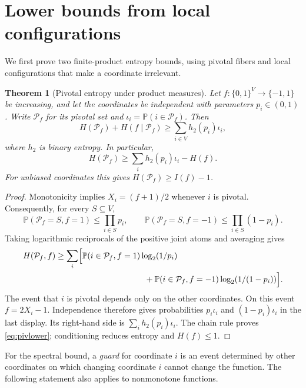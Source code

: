 \documentclass[11pt]{amsart}
\newtheorem{theorem}{Theorem}[section]
\theoremstyle{remark}
\newcommand{\Prob}{\mathbb P}
\newcommand{\cP}{\mathcal P}
\begin{document}
\section{Lower bounds from local configurations}\label{sec:lower}

We first prove two finite-product entropy bounds, using pivotal fibers and local configurations that make a coordinate irrelevant.

\begin{theorem}[Pivotal entropy under product measures]\label{thm:pivlower}
Let $f:\{0,1\}^V\to\{-1,1\}$ be increasing, and let the coordinates be independent with parameters $p_i\in(0,1)$. Write $\cP_f$ for its pivotal set and $\iota_i=\Prob(i\in\cP_f)$. Then
\begin{equation}\label{eq:pivlower}
 H(\cP_f)+H(f\mid\cP_f)\ge\sum_{i\in V}h_2(p_i)\iota_i,
\end{equation}
where $h_2$ is binary entropy. In particular,
\[
 H(\cP_f)\ge\sum_i h_2(p_i)\iota_i-H(f).
\]
For unbiased coordinates this gives $H(\cP_f)\ge I(f)-1$.
\end{theorem}
\begin{proof}
Monotonicity implies $X_i=(f+1)/2$ whenever $i$ is pivotal. Consequently, for every $S\subseteq V$,
\[
 \Prob(\cP_f=S,f=1)\le\prod_{i\in S}p_i,
 \qquad
 \Prob(\cP_f=S,f=-1)\le\prod_{i\in S}(1-p_i).
\]
Taking logarithmic reciprocals of the positive joint atoms and averaging gives
\begin{align*}
 H(\cP_f,f)
 &\ge\sum_i\Bigl[\Prob(i\in\cP_f,f=1)\log_2(1/p_i)\\
 &\hspace{38mm}+\Prob(i\in\cP_f,f=-1)\log_2(1/(1-p_i))\Bigr].
\end{align*}
The event that $i$ is pivotal depends only on the other coordinates. On this event $f=2X_i-1$. Independence therefore gives probabilities $p_i\iota_i$ and $(1-p_i)\iota_i$ in the last display. Its right-hand side is $\sum_i h_2(p_i)\iota_i$. The chain rule proves \eqref{eq:pivlower}; conditioning reduces entropy and $H(f)\le1$.
\end{proof}

For the spectral bound, a \emph{guard} for coordinate $i$ is an event determined by other coordinates on which changing coordinate $i$ cannot change the function. The following statement also applies to nonmonotone functions.
\end{document}
